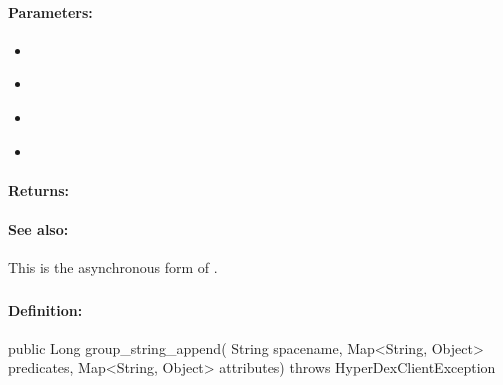 \paragraph{Parameters:}
\begin{itemize}[noitemsep]
\item {}\\

\item {}\\

\item {}\\

\item {}\\

\end{itemize}

\paragraph{Returns:}


\paragraph{See also:}  This is the asynchronous form of .

\pagebreak
\subsubsection{}
\label{api:java:group_string_append}


\paragraph{Definition:}
\begin{javacode}
public Long group_string_append(
        String spacename,
        Map<String, Object> predicates,
        Map<String, Object> attributes) throws HyperDexClientException
\end{javacode}


